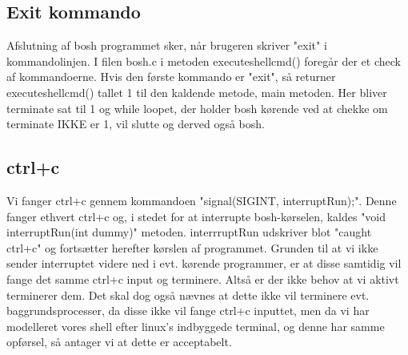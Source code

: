 \subsection{Exit kommando}
Afslutning af bosh programmet sker, når brugeren skriver "exit" i kommandolinjen. I filen bosh.c i metoden executeshellcmd() foregår der et check af kommandoerne. Hvis den første kommando er "exit", så returner executeshellcmd() tallet 1 til den kaldende metode, main metoden. Her bliver terminate sat til 1 og while loopet, der holder bosh kørende ved at chekke om terminate IKKE er 1, vil slutte og derved også bosh.

\subsection{ctrl+c}
Vi fanger ctrl+c gennem kommandoen "signal(SIGINT, interruptRun);". Denne fanger ethvert ctrl+c og, i stedet for at interrupte bosh-kørselen, kaldes "void interruptRun(int dummy)" metoden. interrruptRun udskriver blot "caught ctrl+c" og fortsætter herefter kørslen af programmet. Grunden til at vi ikke sender interruptet videre ned i evt. kørende programmer, er at disse samtidig vil fange det samme ctrl+c input og terminere. Altså er der ikke behov at vi aktivt terminerer dem. Det skal dog også nævnes at dette ikke vil terminere evt. baggrundsprocesser, da disse ikke vil fange ctrl+c inputtet, men da vi har modelleret vores shell efter linux's indbyggede terminal, og denne har samme opførsel, så antager vi at dette er acceptabelt. 

